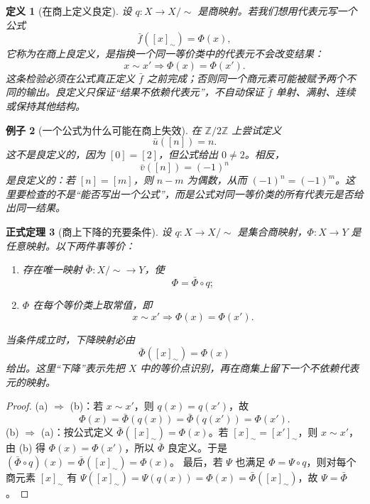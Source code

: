 \documentclass[UTF8,fontset=none,a4paper,11pt]{ctexart}
\theoremstyle{foundation-definition}
\newtheorem{definition}{定义}[section]
\theoremstyle{foundation-theorem}
\newtheorem{theorem}[definition]{正式定理}
\theoremstyle{foundation-proposition}
\theoremstyle{foundation-example}
\newtheorem{example}[definition]{例子}
\theoremstyle{foundation-remark}
\theoremstyle{foundation-theorem}
\begin{document}
\begin{definition}[在商上定义良定]\label{def:well-defined-quotient}
设 \(q:X\to X/{\sim}\) 是商映射。若我们想用代表元写一个公式
\[
\bar f([x]_{\sim})=\Phi(x),
\]
它称为在商上\emph{良定义}，是指换一个同一等价类中的代表元不会改变结果：
\[
x\sim x'\Longrightarrow \Phi(x)=\Phi(x').
\]
这条检验必须在公式真正定义 \(\bar f\) 之前完成；否则同一个商元素可能被赋予两个不同的输出。良定义只保证“结果不依赖代表元”，不自动保证 \(\bar f\) 单射、满射、连续或保持其他结构。
\end{definition}

\begin{example}[一个公式为什么可能在商上失效]
在 \(\mathbb Z/2\mathbb Z\) 上尝试定义
\[
\bar u([n])=n.
\]
这不是良定义的，因为 \([0]=[2]\)，但公式给出 \(0\ne2\)。相反，
\[
\bar v([n])=(-1)^n
\]
是良定义的：若 \([n]=[m]\)，则 \(n-m\) 为偶数，从而
\((-1)^n=(-1)^m\)。这里要检查的不是“能否写出一个公式”，而是公式对同一等价类的所有代表元是否给出同一结果。
\end{example}

\begin{theorem}[商上下降的充要条件]\label{thm:quotient-descent-iff}
设 \(q:X\to X/{\sim}\) 是集合商映射，\(\Phi:X\to Y\) 是任意映射。以下两件事等价：
\begin{enumerate}[label=(\alph*)]
  \item 存在唯一映射 \(\bar\Phi:X/{\sim}\to Y\)，使
  \[
  \Phi=\bar\Phi\circ q;
  \]
  \item \(\Phi\) 在每个等价类上取常值，即
  \[
  x\sim x'\Longrightarrow\Phi(x)=\Phi(x').
  \]
\end{enumerate}
当条件成立时，下降映射必由
\[
\bar\Phi([x]_{\sim})=\Phi(x)
\]
给出。这里“下降”表示先把 \(X\) 中的等价点识别，再在商集上留下一个不依赖代表元的映射。
\end{theorem}

\begin{proof}
(a) \(\Rightarrow\) (b)：若 \(x\sim x'\)，则 \(q(x)=q(x')\)，故
\[
\Phi(x)=\bar\Phi(q(x))=\bar\Phi(q(x'))=\Phi(x').
\]
(b) \(\Rightarrow\) (a)：按公式定义 \(\bar\Phi([x]_\sim)=\Phi(x)\)。若
\([x]_\sim=[x']_\sim\)，则 \(x\sim x'\)，由 (b) 得 \(\Phi(x)=\Phi(x')\)，所以
\(\bar\Phi\) 良定义。于是 \((\bar\Phi\circ q)(x)=\bar\Phi([x]_\sim)=\Phi(x)\)。
最后，若 \(\Psi\) 也满足 \(\Phi=\Psi\circ q\)，则对每个商元素 \([x]_\sim\) 有
\(\Psi([x]_\sim)=\Psi(q(x))=\Phi(x)=\bar\Phi([x]_\sim)\)，故 \(\Psi=\bar\Phi\)。
\end{proof}
\end{document}
